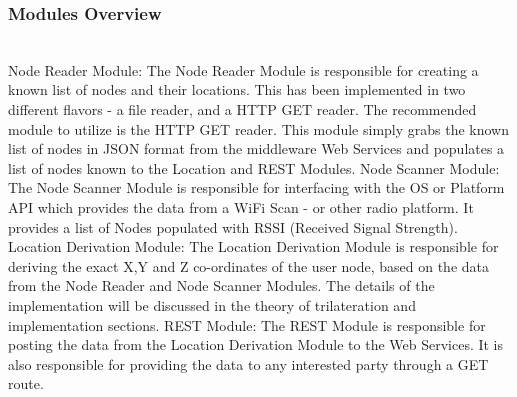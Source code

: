 \documentclass[conference]{IEEEtran}
\begin{document}
\subsubsection{Modules Overview}
\rule[-10pt]{0pt}{10pt}\\
 Node Reader Module:
\newline
The Node Reader Module is responsible for creating a known list of nodes and their locations.  This has been implemented in two different flavors - a file reader, and a HTTP GET reader. The recommended module to utilize is the HTTP GET reader. This module simply grabs the known list of nodes in JSON format from the middleware Web Services and populates a list of nodes known to the Location and REST Modules.
\newline
\newline
Node Scanner Module:
\newline
The Node Scanner Module is responsible for interfacing with the OS or Platform API which provides the data from a WiFi Scan - or other radio platform. It provides a list of Nodes populated with RSSI (Received Signal Strength).
\newline
\newline
Location Derivation Module:
\newline
The Location Derivation Module is responsible for deriving the exact X,Y and Z co-ordinates of the user node, based on the data from the Node Reader and Node Scanner Modules. The details of the implementation will be discussed in the theory of trilateration and implementation sections.
\newline
\newline
REST Module:
\newline
The REST Module is responsible for posting the data from the Location Derivation Module to the Web Services. It is also responsible for providing the data to any interested party through a GET route.
\newline
\end{document}
